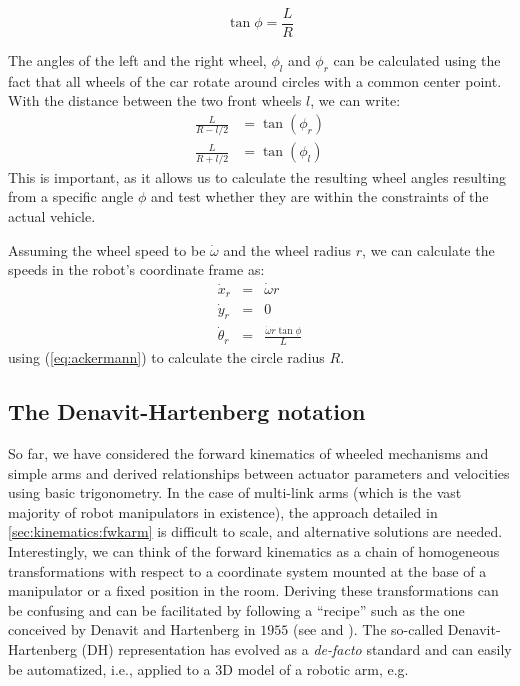 \begin{equation}\label{eq:ackermann}
\tan \phi = \frac{L}{R}
\end{equation}

The angles of the left and the right wheel, $ \phi_l$ and $ \phi_r$ can be calculated using the fact that all wheels of the car rotate around circles with a common center point. With the distance between the two front wheels $l$, we can write:
\begin{eqnarray}
\frac{L}{R-l/2}&=\tan{(\phi_r)} \nonumber \\
\frac{L}{R+l/2}&=\tan{(\phi_l)}
\end{eqnarray}
This is important, as it allows us to calculate the resulting wheel angles resulting from a specific angle $\phi$ and test whether they are within the constraints of the actual vehicle.

Assuming the wheel speed to be $\dot{\omega}$ and the wheel radius $r$, we can calculate the speeds in the robot's coordinate frame as:
\begin{eqnarray}
\dot{x}_r&=&\dot{\omega}r \nonumber \\
\dot{y}_r&=&0\\
\dot{\theta}_r&=&\frac{\dot{\omega}r\tan\phi}{L} \nonumber
\end{eqnarray}
using (\ref{eq:ackermann}) to calculate the circle radius $R$.

\subsection{The Denavit-Hartenberg notation}\label{sec:kinematics:dh}

So far, we have considered the forward kinematics of wheeled mechanisms and simple arms and derived relationships between actuator parameters and velocities using basic trigonometry.
In the case of multi-link arms (which is the vast majority of robot manipulators in existence), the approach detailed in \cref{sec:kinematics:fwkarm} is difficult to scale, and alternative solutions are needed.
Interestingly, we can think of the forward kinematics as a chain of homogeneous transformations with respect to a coordinate system mounted at the base of a manipulator or a fixed position in the room.
Deriving these transformations can be confusing and can be facilitated by following a ``recipe'' such as the one conceived by Denavit and Hartenberg in $1955$ (see \cite{hartenberg1955kinematic} and \cite{craig2009introduction}).
The so-called Denavit-Hartenberg (DH) representation has evolved as a \textsl{de-facto} standard and can easily be automatized, i.e., applied to a 3D model of a robotic arm, e.g. 

